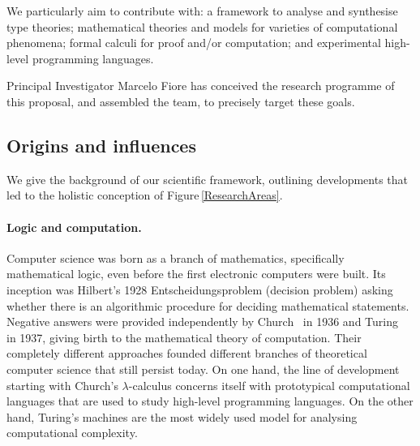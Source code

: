 \documentclass[11pt,twocolumn]{article}
\newcommand{\pref}[1]{\,(\ref{#1})}
\newcommand{\lcalculus}{\mbox{$\lambda$-calculus}}
\begin{document}
We particularly aim to contribute with: a framework to analyse and synthesise
type theories; mathematical theories and models for varieties of
computational phenomena; formal calculi for proof and/or computation; and
experimental high-level programming languages.

Principal Investigator Marcelo Fiore has conceived the research programme of
this proposal, and assembled the team, to precisely target these goals.

\subsection{Origins and influences}
\label{Origins}


We give the background of our scientific framework, outlining developments
that led to the holistic conception of Figure\,\ref{ResearchAreas}.

\paragraph{Logic and computation.}

Computer science was born as a branch of mathematics, specifically
mathematical logic, even before the first electronic computers were built.
Its inception %
was Hilbert's %
1928 Entscheidungsproblem (decision problem)
asking whether there is an algorithmic procedure for deciding mathematical
statements.  Negative answers were provided independently by
Church~\cite{Church1936} in 1936 and Turing~\cite{Turing} in 1937,
giving birth to the mathematical theory of computation.  Their completely
different approaches 
founded %
different branches of theoretical
computer science that still persist today.  
On one hand, the line
of development starting with Church's {\lcalculus} %
concerns itself with prototypical computational languages that are
used to study high-level programming languages.  
On the other hand, Turing's machines %
are the most widely 
used model for analysing computational complexity.
\end{document}
